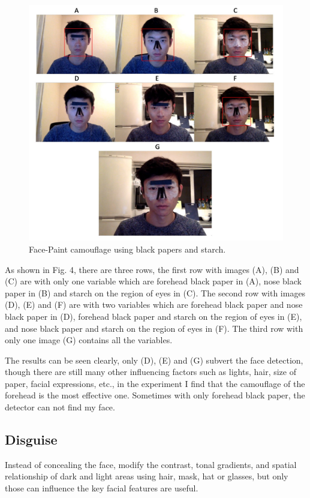 \documentclass[conference]{IEEEtran}
\begin{document}
\begin{figure}
  \centerline{\includegraphics[scale=0.5]{./image/Face_Paint.png}}
  \caption{Face-Paint camouflage using black papers and starch. }
  \label{fig}
\end{figure}

As shown in Fig. 4, there are three rows, the first row with images (A), (B) and (C) are with only one variable which are forehead black paper in (A), nose black paper in (B) and starch on the region of eyes in (C). The second row with images (D), (E) and (F) are with two variables which are forehead black paper and nose black paper in (D), forehead black paper and starch on the region of eyes in (E), and nose black paper and starch on the region of eyes in (F). The third row with only one image (G) contains all the variables.

The results can be seen clearly, only (D), (E) and (G) subvert the face detection, though there are still many other influencing factors such as lights, hair, size of paper, facial expressions, etc., in the experiment I find that the camouflage of the forehead is the most effective one. Sometimes with only forehead black paper, the detector can not find my face.

\subsection{Disguise}
Instead of concealing the face, modify the contrast, tonal gradients, and spatial relationship of dark and light areas using hair, mask, hat or glasses, but only those can influence the key facial features are useful.
\end{document}
